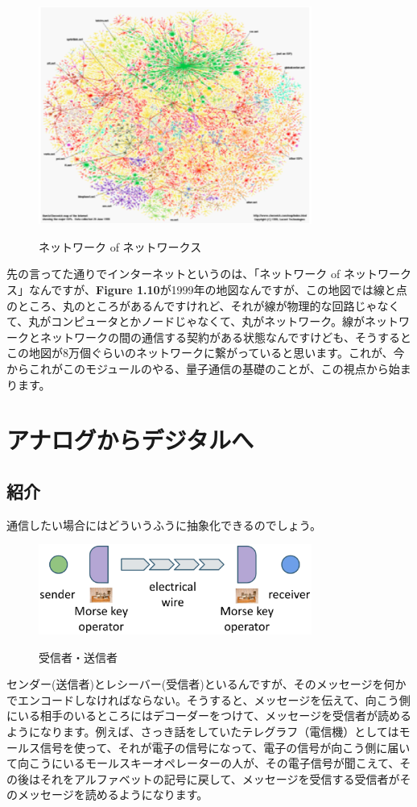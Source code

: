 \begin{figure}[H]
    \includegraphics[width=0.8\textwidth]{lesson1/internetmap.eps}
    \label{fig: 1}
    \caption{ネットワーク of ネットワークス}
\end{figure}
先の言ってた通りでインターネットというのは、「ネットワーク of ネットワークス」なんですが、\textbf{Figure 1.10}が1999年の地図なんですが、この地図では線と点のところ、丸のところがあるんですけれど、それが線が物理的な回路じゃなくて、丸がコンピュータとかノードじゃなくて、丸がネットワーク。線がネットワークとネットワークの間の通信する契約がある状態なんですけども、そうするとこの地図が8万個ぐらいのネットワークに繋がっていると思います。これが、今からこれがこのモジュールのやる、量子通信の基礎のことが、この視点から始まります。

\section{アナログからデジタルへ}

\subsection{紹介}
通信したい場合にはどういうふうに抽象化できるのでしょう。
\begin{figure}[H]
    \includegraphics[width=0.8\textwidth]{lesson1/sender_receiver.eps}
    \label{fig: 1}
    \caption{受信者・送信者}
\end{figure}
センダー(送信者)とレシーバー(受信者)といるんですが、そのメッセージを何かでエンコードしなければならない。そうすると、メッセージを伝えて、向こう側にいる相手のいるところにはデコーダーをつけて、メッセージを受信者が読めるようになります。例えば、さっき話をしていたテレグラフ（電信機）としてはモールス信号を使って、それが電子の信号になって、電子の信号が向こう側に届いて向こうにいるモールスキーオペレーターの人が、その電子信号が聞こえて、その後はそれをアルファベットの記号に戻して、メッセージを受信する受信者がそのメッセージを読めるようになります。

